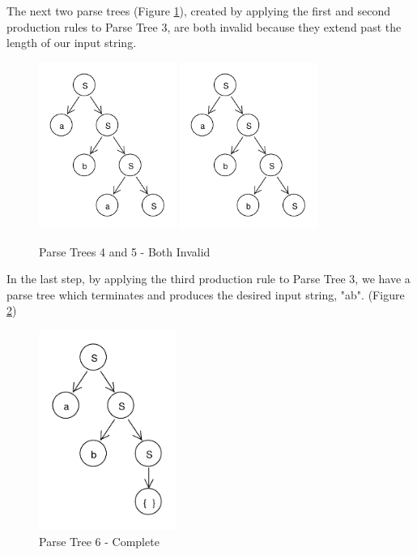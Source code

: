 \documentclass[11pt]{article}
\begin{document}
The next two parse trees (Figure \ref{fig:rdp_4_5}), created by applying the first and second production rules to
Parse Tree 3, are both invalid because they extend past the length of our input string.

\begin{figure}[h!]
    \centering
    \includegraphics[width=0.4\textwidth,natwidth=30,natheight=30]{umlet/rdp_4.pdf}
    \includegraphics[width=0.4\textwidth,natwidth=30,natheight=30]{umlet/rdp_5.pdf}
    \caption{Parse Trees 4 and 5 - Both Invalid}
    \label{fig:rdp_4_5}
\end{figure}

In the last step, by applying the third production rule to Parse Tree 3, we have a parse tree which terminates and produces the
desired input string, "ab". (Figure \ref{fig:rdp_6})

\begin{figure}[h!]
    \centering
    \includegraphics[width=0.4\textwidth,natwidth=30,natheight=30]{umlet/rdp_6.pdf}
    \caption{Parse Tree 6 - Complete}
    \label{fig:rdp_6}
\end{figure}
\end{document}
